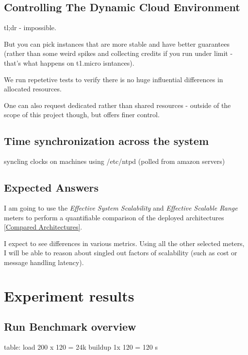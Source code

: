\documentclass{uvamscse}
\begin{document}
\section{Controlling The Dynamic Cloud Environment}
tl;dr - impossible.

But you can pick instances that are more stable and have better guarantees (rather than some weird spikes and collecting credits if you run under limit - that's what happens on t1.micro isntances).

We run repetetive tests to verify there is no huge influential differences in allocated resources.

One can also request dedicated rather than shared resources - outside of the scope of this project though, but offers finer control.

\section{Time synchronization across the system}
syncling clocks on machines using /etc/ntpd (polled from amazon servers)


\section{Expected Answers}\label{Expected Answers}
I am going to use the \textit{Effective System Scalability} and \textit{Effective Scalable Range} meters to perform a quantifiable comparison of the deployed architectures \ref{Compared Architectures}.

I expect to see differences in various metrics. Using all the other selected meters, I will be able to reason about singled out factors of scalability (such as cost or message handling latency).


\chapter{Experiment results}\label{Experiment results}

\section{Run Benchmark overview}

table:
load 200 x 120 = 24k
buildup 1x 120 = 120 s
\end{document}
